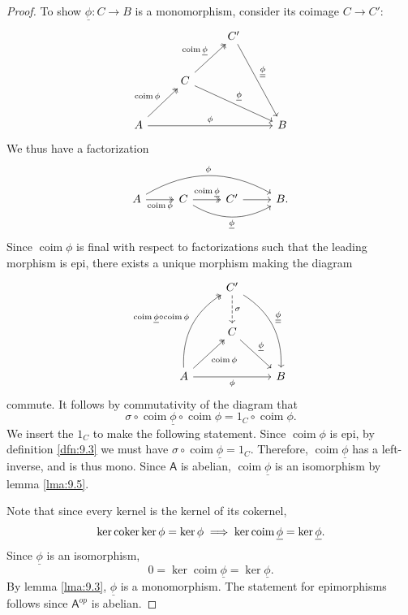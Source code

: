 \begin{proof}
	To show $\underline{\phi }: C \to B$ is a monomorphism, consider its coimage $C\to C'$:
	\[\begin{tikzcd}[row sep = 2.5em, column sep = 2.5em]
		&&C'\arrow[ddr, "\underline{\underline{\phi }}"]\\
		&C\arrow[drr, "\underline{\phi }"]\arrow[ur, two heads, "\operatorname{coim} \underline{\phi }"]\\
		A\arrow[rrr, "\phi "]\arrow[ur, two heads, "\operatorname{coim} \phi "]&&&B
	\end{tikzcd}\]
	We thus have a factorization
	\[\begin{tikzcd}[row sep = 2.5em, column sep = 2.5em]
		A\arrow[rrr, bend left, "\phi "]\arrow[r, two heads, "\operatorname{coim} \phi "']&C\arrow[r, two heads, "\operatorname{coim} \underline{\phi }"]\arrow[rr, bend right, "\underline{\phi }"']&C'\arrow[r]&B.
	\end{tikzcd}\]
	Since $\operatorname{coim} \phi $ is final with respect to factorizations such that the leading morphism is epi, there exists a unique morphism making the diagram
	\[\begin{tikzcd}[row sep = 2.5em, column sep = 2.5em]
		&C'\arrow[d, dashed, "\sigma "]\arrow[ddr, bend left, "\underline{\underline{\phi }}"]\\
		&C\arrow[dr, "\underline{\phi }"]\\
		A\arrow[rr, "\phi "']\arrow[ur, "\operatorname{coim} \phi "', two heads]\arrow[uur, bend left, two heads, "\operatorname{coim} \underline{\phi }\circ \operatorname{coim} \phi "]&&B
	\end{tikzcd}\]
	commute. It follows by commutativity of the diagram that
	\[
		\sigma \circ \operatorname{coim} \underline{\phi }\circ \operatorname{coim} \phi =1_C\circ \operatorname{coim} \phi 
	.\]
	We insert the $1_C$ to make the following statement. Since $\operatorname{coim} \phi $ is epi, by definition \ref{dfn:9.3} we must have $\sigma \circ \operatorname{coim} \underline{\phi }=1_C$. Therefore, $\operatorname{coim} \underline{\phi }$ has a left-inverse, and is thus mono. Since $\mathsf{A} $ is abelian, $\operatorname{coim} \underline{\phi }$ is an isomorphism by lemma \ref{lma:9.5}.

	Note that since every kernel is the kernel of its cokernel,
	\[
		\ker \operatorname{coker} \ker \phi =\ker \phi \implies \ker \operatorname{coim} \underline{\phi }=\ker \underline{\phi }
	.\]
	Since $\underline{\phi }$ is an isomorphism,
	\[
		0=\ker \operatorname{coim} \underline{\phi }=\ker \underline{\phi }
	.\]
	By lemma \ref{lma:9.3}, $\underline{\phi }$ is a monomorphism. The statement for epimorphisms follows since $\mathsf{A} ^{op} $ is abelian.
\end{proof}

